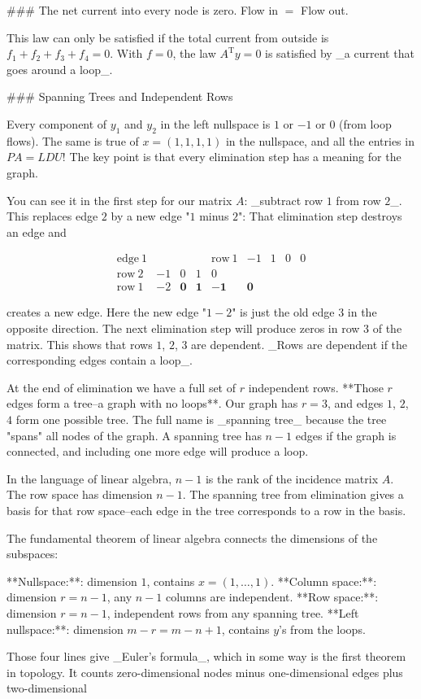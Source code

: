 

### The net current into every node is zero. Flow in \(=\) Flow out.

This law can only be satisfied if the total current from outside is \(f_{1}+f_{2}+f_{3}+f_{4}=0\). With \(f=0\), the law \(A^{\mathrm{T}}y=0\) is satisfied by _a current that goes around a loop_.

### Spanning Trees and Independent Rows

Every component of \(y_{1}\) and \(y_{2}\) in the left nullspace is \(1\) or \(-1\) or \(0\) (from loop flows). The same is true of \(x=(1,1,1,1)\) in the nullspace, and all the entries in \(PA=LDU\)! The key point is that every elimination step has a meaning for the graph.

You can see it in the first step for our matrix \(A\): _subtract row \(1\) from row \(2\)_. This replaces edge \(2\) by a new edge "\(1\) minus \(2\)": That elimination step destroys an edge and

\[\begin{array}{ccccc}\mathrm{edge}\ 1&&&&\mathrm{row}\ 1&-1&1&0&0\\ \mathrm{row}\ 2&-1&0&1&0\\ \mathrm{row}\ 1&-2&\mathbf{0}&\mathbf{1}&-\mathbf{1}&\mathbf{0}\end{array}\]

creates a new edge. Here the new edge "\(1-2\)" is just the old edge \(3\) in the opposite direction. The next elimination step will produce zeros in row \(3\) of the matrix. This shows that rows \(1\), \(2\), \(3\) are dependent. _Rows are dependent if the corresponding edges contain a loop_.

At the end of elimination we have a full set of \(r\) independent rows. **Those \(r\) edges form a tree--a graph with no loops**. Our graph has \(r=3\), and edges \(1\), \(2\), \(4\) form one possible tree. The full name is _spanning tree_ because the tree "spans" all nodes of the graph. A spanning tree has \(n-1\) edges if the graph is connected, and including one more edge will produce a loop.

In the language of linear algebra, \(n-1\) is the rank of the incidence matrix \(A\). The row space has dimension \(n-1\). The spanning tree from elimination gives a basis for that row space--each edge in the tree corresponds to a row in the basis.

The fundamental theorem of linear algebra connects the dimensions of the subspaces:

**Nullspace:**: dimension \(1\), contains \(x=(1,\ldots,1)\).
**Column space:**: dimension \(r=n-1\), any \(n-1\) columns are independent.
**Row space:**: dimension \(r=n-1\), independent rows from any spanning tree.
**Left nullspace:**: dimension \(m-r=m-n+1\), contains \(y\)'s from the loops.

Those four lines give _Euler's formula_, which in some way is the first theorem in topology. It counts zero-dimensional nodes minus one-dimensional edges plus two-dimensional
